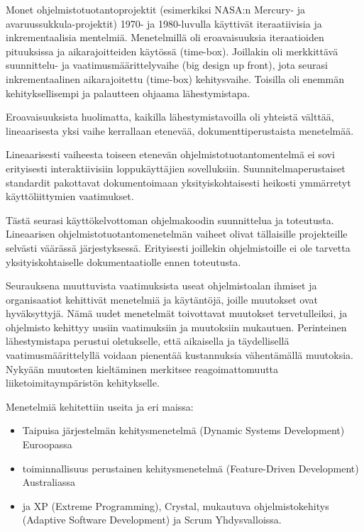 \documentclass[finnish]{tktltiki2}
\theoremstyle{definition}
\theoremstyle{remark}
\begin{document}
Monet ohjelmistotuotantoprojektit  (esimerkiksi NASA:n Mercury- ja avaruussukkula-projektit) 1970- ja 1980-luvulla käyttivät iteraatiivisia ja inkrementaalisia mentelmiä.  Menetelmillä oli eroavaisuuksia iteraatioiden pituuksissa ja aikarajoitteiden käytössä (time-box). Joillakin oli merkkittävä suunnittelu- ja vaatimusmäärittelyvaihe (big design up front), jota seurasi inkrementaalinen aikarajoitettu (time-box) kehitysvaihe. Toisilla oli enemmän kehityksellisempi ja palautteen ohjaama lähestymistapa\cite{LAB03}.

Eroavaisuuksista huolimatta, kaikilla lähestymistavoilla oli yhteistä välttää, lineaarisesta yksi vaihe kerrallaan etenevää, dokumenttiperustaista menetelmää\cite{LAB03}.

Lineaarisesti vaiheesta toiseen etenevän ohjelmistotuotantomentelmä ei sovi erityisesti interaktiivisiin loppukäyttäjien sovelluksiin. Suunnitelmaperustaiset standardit pakottavat dokumentoimaan yksityiskohtaisesti heikosti ymmärretyt käyttöliittymien vaatimukset\cite{BOE88}.

Tästä seurasi käyttökelvottoman ohjelmakoodin suunnittelua ja toteutusta. Lineaarisen ohjelmistotuotantomenetelmän vaiheet olivat tällaisille projekteille selvästi väärässä järjestyksessä. Erityisesti joillekin ohjelmistoille ei ole tarvetta yksityiskohtaiselle dokumentaatiolle ennen toteutusta\cite{BOE88}.

Seurauksena muuttuvista vaatimuksista useat ohjelmistoalan ihmiset ja organisaatiot kehittivät menetelmiä ja käytäntöjä, joille muutokset ovat hyväksyttyjä. Nämä uudet menetelmät toivottavat muutokset tervetulleiksi, ja ohjelmisto kehittyy uusiin vaatimuksiin ja muutoksiin mukautuen\cite{WIC03}. Perinteinen lähestymistapa perustui oletukselle, että aikaisella ja täydellisellä vaatimusmäärittelyllä voidaan pienentää kustannuksia vähentämällä muutoksia. Nykyään muutosten kieltäminen merkitsee reagoimattomuutta liiketoimitaympäristön kehitykselle\cite{HIC01}.

Menetelmiä kehitettiin useita ja eri maissa: 
\begin{itemize}
 \item Taipuisa järjestelmän kehitysmenetelmä (Dynamic Systems Development) Euroopassa
 \item toiminnallisuus perustainen kehitysmenetelmä (Feature-Driven Development) Australiassa
 \item ja XP (Extreme Programming)\cite{BEC99}, Crystal\cite{COC05}, mukautuva ohjelmistokehitys (Adaptive Software Development) ja Scrum\cite{SCH09} Yhdysvalloissa\cite{WIC03}.
\end{itemize}
\end{document}
